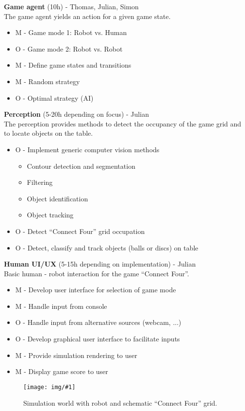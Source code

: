 \documentclass[11pt,pdftex,a4paper]{article}
\newcommand{\image}[1]{


\begin{center}
	\texttt{[image: img/\#1]}
\end{center}
}
\begin{document}
	\noindent
	\textbf{Game agent} (10h) - Thomas, Julian, Simon\\
	The game agent yields an action for a given game state.
	\begin{itemize}
	\item M - Game mode 1:  Robot vs. Human
	\item O - Game mode 2:  Robot vs. Robot
	\item M - Define game states and transitions
	\item M - Random strategy
	\item O - Optimal strategy (AI)
	\end{itemize}
	
	\noindent
	\textbf{Perception} (5-20h depending on focus) - Julian\\
	The perception provides methods to detect the occupancy of the game grid and to locate objects on the table.
	\begin{itemize}
	\item O - Implement generic computer vision methods
		\begin{itemize}
		\item Contour detection and segmentation
		\item Filtering
		\item Object identification
		\item Object tracking	
		\end{itemize}
	\item O - Detect ``Connect Four'' grid occupation
	\item O - Detect, classify and track objects (balls or discs) on table
	\end{itemize}
	
	\noindent
	\textbf{Human UI/UX} (5-15h depending on implementation) - Julian\\
	Basic human - robot interaction for the game ``Connect Four''.
	\begin{itemize}
	\item M - Develop user interface for selection of game mode
	\item M - Handle input from console
	\item O - Handle input from alternative sources (webcam, ...)	
	\item O - Develop graphical user interface to facilitate inputs
	\item M - Provide simulation rendering to user
	\item M - Display game score to user
	\end{itemize}
	
	\begin{figure}[H]
	\image{Connect-4-concept}
	\caption{Simulation world with robot and schematic ``Connect Four'' grid.}
	\end{figure}
\end{document}
